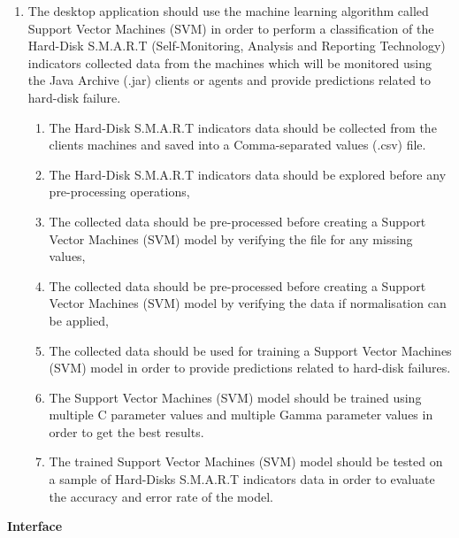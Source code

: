 \begin{enumerate}
    \item The desktop application should use the machine learning algorithm called Support Vector Machines (SVM)
          in order to perform a classification of the Hard-Disk S.M.A.R.T (Self-Monitoring, Analysis and Reporting
          Technology) indicators collected data from the machines which will be monitored using the Java Archive
          (.jar) clients or agents and provide predictions related to hard-disk failure.
    \begin{enumerate}
        \item The Hard-Disk S.M.A.R.T indicators data should be collected from the clients machines and saved into
              a Comma-separated values (.csv) file.
        \item The Hard-Disk S.M.A.R.T indicators data should be explored before any pre-processing operations,
        \item The collected data should be pre-processed before creating a Support Vector Machines (SVM) model by
              verifying the file for any missing values,
        \item The collected data should be pre-processed before creating a Support Vector Machines (SVM) model by
              verifying the data if normalisation can be applied,
        \item The collected data should be used for training a Support Vector Machines (SVM) model in order to
              provide predictions related to hard-disk failures.
        \item The Support Vector Machines (SVM) model should be trained using multiple C parameter values and
              multiple Gamma parameter values in order to get the best results.
        \item The trained Support Vector Machines (SVM) model should be tested on a sample of Hard-Disks
              S.M.A.R.T indicators data in order to evaluate the accuracy and error rate of the model.
    \end{enumerate}
\end{enumerate}

\newpage

\noindent
\textbf{Interface}

